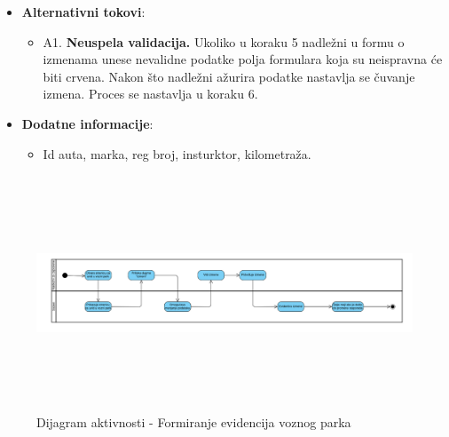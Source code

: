 \begin{itemize}
  \item \textbf{Alternativni tokovi}:
      \begin{itemize}
        \item A1. \textbf{Neuspela validacija.}
        Ukoliko u koraku 5 nadležni u formu o izmenama unese nevalidne podatke polja formulara koja su neispravna će biti crvena.
        Nakon što nadležni ažurira podatke nastavlja se čuvanje izmena. Proces se nastavlja u koraku 6.
      \end{itemize}
      
  \item \textbf{Dodatne informacije}:
      \begin{itemize}
        \item Id auta, marka, reg broj, insturktor, kilometraža. 
      \end{itemize}
\end{itemize}

\begin{figure}[H]
  \begin{center}
      \includegraphics[width=140mm, height=70mm]{Diagrams/evidencija_vozila.png}
  \end{center}
  \caption {Dijagram aktivnosti - Formiranje evidencija voznog parka}
  \label{activity_evidencija_vozila}

\end{figure}
